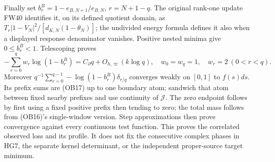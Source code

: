 Finally set $b_r^B=1-e_{B,N+1}/e_{B,N}$, $r=N+1-q$. The original
rank-one update FW40 identifies it, on its defined quotient domain, as
$T_r|1-V_N|^2/[d_{K,N}(1-\theta_N)]$; the undivided energy formula
defines it also when a displayed response denominator vanishes.
Positive nested minima give $0\le b_r^B<1$. Telescoping proves
\[
 -\sum_{r=0}^{q}w_r\log(1-b_r^B)
 =C_\partial q+O_{h,\varpi}(k\log q),\quad
 w_0=w_q=1,\quad w_r=2\ (0<r<q).\tag{OB20}
\]
Moreover $q^{-1}\sum_{r=0}^{q-1}-\log(1-b_r^B)\delta_{r/q}$
converges weakly on $[0,1]$ to $f(s)ds$. Its prefix sums are (OB17)
up to one boundary atom; sandwich that atom between fixed nearby
prefixes and use continuity of $\mathcal J$. The zero endpoint follows
by first using a fixed positive prefix then tending to zero; the total
mass follows from (OB16)'s single-window version. Step approximations
then prove convergence against every continuous test function.
This proves the correlated observed loss and its profile. It does not
fix the consecutive complex phases in HG7, the separate kernel
determinant, or the independent proper-source target minimum.
